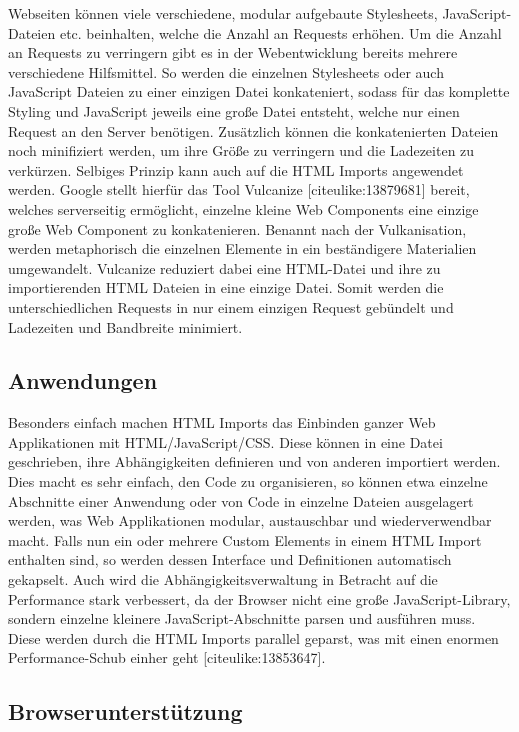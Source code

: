 Webseiten können viele verschiedene, modular aufgebaute Stylesheets,
JavaScript-Dateien etc. beinhalten, welche die Anzahl an Requests
erhöhen. Um die Anzahl an Requests zu verringern gibt es in der
Webentwicklung bereits mehrere verschiedene Hilfsmittel. So werden die
einzelnen Stylesheets oder auch JavaScript Dateien zu einer einzigen
Datei konkateniert, sodass für das komplette Styling und JavaScript
jeweils eine große Datei entsteht, welche nur einen Request an den
Server benötigen. Zusätzlich können die konkatenierten Dateien noch
minifiziert werden, um ihre Größe zu verringern und die Ladezeiten zu
verkürzen. Selbiges Prinzip kann auch auf die HTML Imports angewendet
werden. Google stellt hierfür das Tool Vulcanize
{[}citeulike:13879681{]} bereit, welches serverseitig ermöglicht,
einzelne kleine Web Components eine einzige große Web Component zu
konkatenieren. Benannt nach der Vulkanisation, werden metaphorisch die
einzelnen Elemente in ein beständigere Materialien umgewandelt.
Vulcanize reduziert dabei eine HTML-Datei und ihre zu importierenden
HTML Dateien in eine einzige Datei. Somit werden die unterschiedlichen
Requests in nur einem einzigen Request gebündelt und Ladezeiten und
Bandbreite minimiert.

\subsection{Anwendungen}\label{anwendungen}

Besonders einfach machen HTML Imports das Einbinden ganzer Web
Applikationen mit HTML/JavaScript/CSS. Diese können in eine Datei
geschrieben, ihre Abhängigkeiten definieren und von anderen importiert
werden. Dies macht es sehr einfach, den Code zu organisieren, so können
etwa einzelne Abschnitte einer Anwendung oder von Code in einzelne
Dateien ausgelagert werden, was Web Applikationen modular, austauschbar
und wiederverwendbar macht. Falls nun ein oder mehrere Custom Elements
in einem HTML Import enthalten sind, so werden dessen Interface und
Definitionen automatisch gekapselt. Auch wird die
Abhängigkeitsverwaltung in Betracht auf die Performance stark
verbessert, da der Browser nicht eine große JavaScript-Library, sondern
einzelne kleinere JavaScript-Abschnitte parsen und ausführen muss. Diese
werden durch die HTML Imports parallel geparst, was mit einen enormen
Performance-Schub einher geht {[}citeulike:13853647{]}.

\subsection{Browserunterstützung}\label{browserunterstuxfctzung}

